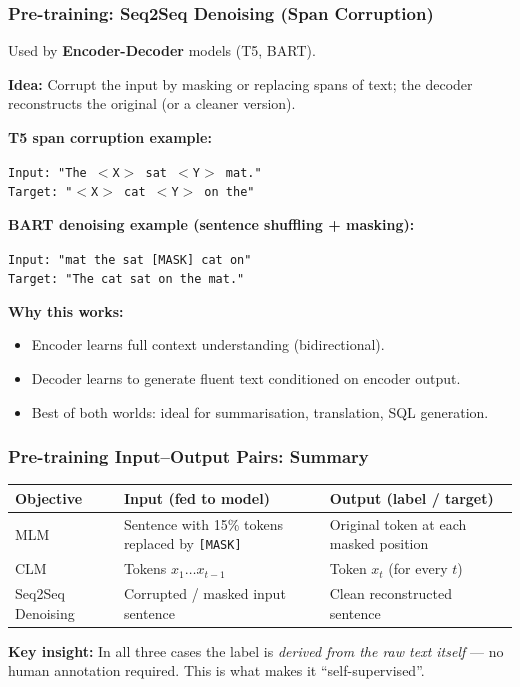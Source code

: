\begin{frame}[fragile]\frametitle{Pre-training: Seq2Seq Denoising (Span Corruption)}

Used by \textbf{Encoder-Decoder} models (T5, BART).

\textbf{Idea:} Corrupt the input by masking or replacing spans of text; the decoder reconstructs the original (or a cleaner version).

\textbf{T5 span corruption example:}
\begin{center}
\texttt{Input:  "The $<$X$>$ sat $<$Y$>$ mat."}\\
\texttt{Target: "$<$X$>$ cat $<$Y$>$ on the"}
\end{center}

\textbf{BART denoising example (sentence shuffling + masking):}
\begin{center}
\texttt{Input:  "mat the sat [MASK] cat on"}\\
\texttt{Target: "The cat sat on the mat."}
\end{center}

\textbf{Why this works:}
\begin{itemize}
\item Encoder learns full context understanding (bidirectional).
\item Decoder learns to generate fluent text conditioned on encoder output.
\item Best of both worlds: ideal for summarisation, translation, SQL generation.
\end{itemize}

\end{frame}

\begin{frame}[fragile]\frametitle{Pre-training Input--Output Pairs: Summary}

\begin{center}
\begin{tabular}{|p{2.5cm}|p{3.5cm}|p{3.5cm}|}
\hline
\textbf{Objective} & \textbf{Input (fed to model)} & \textbf{Output (label / target)} \\
\hline
MLM & Sentence with 15\% tokens replaced by \texttt{[MASK]} & Original token at each masked position \\
\hline
CLM & Tokens $x_1 \ldots x_{t-1}$ & Token $x_t$ (for every $t$) \\
\hline
Seq2Seq Denoising & Corrupted / masked input sentence & Clean reconstructed sentence \\
\hline
\end{tabular}
\end{center}

\vspace{0.3cm}
\textbf{Key insight:} In all three cases the label is \emph{derived from the raw text itself} --- no human annotation required. This is what makes it ``self-supervised''.

\end{frame}
